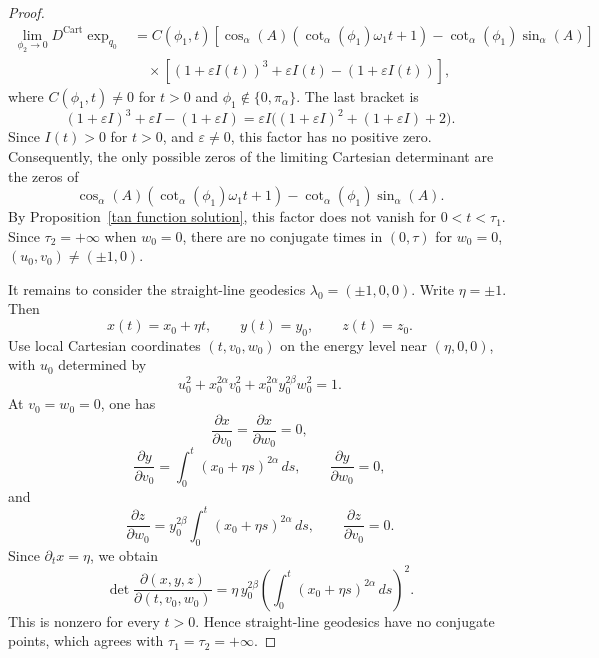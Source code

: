 \documentclass[12pt]{amsart}
\numberwithin{equation}{section}
\theoremstyle{plain}
\theoremstyle{definition}
\theoremstyle{remark}
\begin{document}
\begin{proof}
    \begin{equation}\label{e.cart-limit-w0}
        \begin{aligned}
            \lim_{\phi_2\to0}
            D^{\operatorname{Cart}}\exp_{q_0}
             & =
            C(\phi_1,t)
            \left[
                \cos_\alpha(A)
                \left(\cot_\alpha(\phi_1)\omega_1t+1\right)
                -
                \cot_\alpha(\phi_1)\sin_\alpha(A)
                \right]
            \\
             & \quad\times
            \left[
                (1+\varepsilon I(t))^3
                +
                \varepsilon I(t)
                -
                (1+\varepsilon I(t))
                \right],
        \end{aligned}
    \end{equation}
    where \(C(\phi_1,t)\neq0\) for \(t>0\) and
    \(\phi_1\notin\{0,\pi_\alpha\}\). The last bracket is
    \[
        (1+\varepsilon I)^3+\varepsilon I-(1+\varepsilon I)
        =
        \varepsilon I\bigl((1+\varepsilon I)^2+(1+\varepsilon I)+2\bigr).
    \]
    Since \(I(t)>0\) for \(t>0\), and \(\varepsilon\neq0\), this factor has no positive zero.
    Consequently, the only possible zeros of the limiting Cartesian determinant are the zeros
    of
    \[
        \cos_\alpha(A)
        \left(\cot_\alpha(\phi_1)\omega_1t+1\right)
        -
        \cot_\alpha(\phi_1)\sin_\alpha(A).
    \]
    By Proposition~\ref{tan function solution}, this factor does not vanish for
    \(0<t<\tau_1\). Since \(\tau_2=+\infty\) when \(w_0=0\), there are no conjugate times in
    \((0,\tau)\) for \(w_0=0\), \((u_0,v_0)\neq(\pm1,0)\).

    It remains to consider the straight-line geodesics \(\lambda_0=(\pm1,0,0)\). Write
    \(\eta=\pm1\). Then
    \[
        x(t)=x_0+\eta t,
        \qquad
        y(t)=y_0,
        \qquad
        z(t)=z_0.
    \]
    Use local Cartesian coordinates \((t,v_0,w_0)\) on the energy level near
    \((\eta,0,0)\), with \(u_0\) determined by
    \[
        u_0^2+x_0^{2\alpha}v_0^2+x_0^{2\alpha}y_0^{2\beta}w_0^2=1.
    \]
    At \(v_0=w_0=0\), one has
    \[
        \frac{\partial x}{\partial v_0}
        =
        \frac{\partial x}{\partial w_0}
        =
        0,
    \]
    \[
        \frac{\partial y}{\partial v_0}
        =
        \int_0^t (x_0+\eta s)^{2\alpha}\,ds,
        \qquad
        \frac{\partial y}{\partial w_0}=0,
    \]
    and
    \[
        \frac{\partial z}{\partial w_0}
        =
        y_0^{2\beta}
        \int_0^t (x_0+\eta s)^{2\alpha}\,ds,
        \qquad
        \frac{\partial z}{\partial v_0}=0.
    \]
    Since \(\partial_t x=\eta\), we obtain
    \begin{equation}\label{e.straight-line-det}
        \det
        \frac{\partial(x,y,z)}
        {\partial(t,v_0,w_0)}
        =
        \eta\,y_0^{2\beta}
        \left(
        \int_0^t (x_0+\eta s)^{2\alpha}\,ds
        \right)^2.
    \end{equation}
    This is nonzero for every \(t>0\). Hence straight-line geodesics have no conjugate
    points, which agrees with \(\tau_1=\tau_2=+\infty\).


\end{proof}
\end{document}
